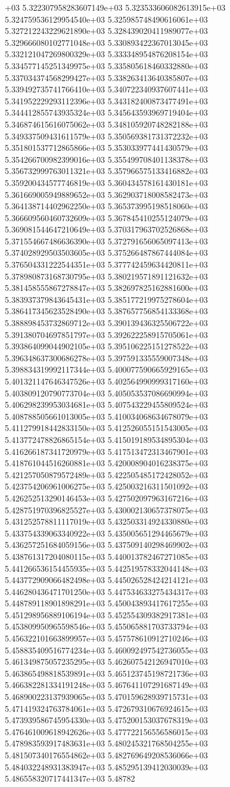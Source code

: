 +03	5.322307958283607149e+03	5.323533606082613915e+03	5.324759536129954540e+03	5.325985748490616061e+03	5.327212243229621890e+03	5.328439020411989077e+03	5.329666080102771048e+03	5.330893422367013045e+03	5.332121047269800329e+03	5.333348954876208154e+03	5.334577145251349975e+03	5.335805618460332880e+03	5.337034374568299427e+03	5.338263413640385807e+03	5.339492735741766410e+03	5.340722340937607441e+03	5.341952229293112396e+03	5.343182400873477491e+03	5.344412855743935324e+03	5.345643593969719404e+03	5.346874615616075062e+03	5.348105920748282188e+03	5.349337509431611579e+03	5.350569381731372232e+03	5.351801537712865866e+03	5.353033977441430579e+03	5.354266700982399016e+03	5.355499708401138378e+03	5.356732999763011321e+03	5.357966575133416882e+03	5.359200434577746819e+03	5.360434578161430181e+03	5.361669005949889652e+03	5.362903718008582473e+03	5.364138714402962250e+03	5.365373995198518060e+03	5.366609560460732609e+03	5.367845410255124079e+03	5.369081544647210649e+03	5.370317963702526868e+03	5.371554667486636390e+03	5.372791656065097413e+03	5.374028929503503605e+03	5.375266487867444084e+03	5.376504331222544351e+03	5.377742459634420811e+03	5.378980873168730795e+03	5.380219571891121632e+03	5.381458555867278847e+03	5.382697825162881600e+03	5.383937379843645431e+03	5.385177219975278604e+03	5.386417345623528490e+03	5.387657756854133368e+03	5.388898453732869712e+03	5.390139436325506722e+03	5.391380704697851797e+03	5.392622258915705061e+03	5.393864099044902105e+03	5.395106225151278522e+03	5.396348637300686278e+03	5.397591335559007348e+03	5.398834319992117344e+03	5.400077590665929165e+03	5.401321147646347526e+03	5.402564990999317160e+03	5.403809120790773704e+03	5.405053537086690994e+03	5.406298239953034681e+03	5.407543229455809524e+03	5.408788505661013005e+03	5.410034068634678079e+03	5.411279918442833150e+03	5.412526055151543005e+03	5.413772478826865154e+03	5.415019189534895304e+03	5.416266187341720979e+03	5.417513472313467901e+03	5.418761044516260881e+03	5.420008904016238375e+03	5.421257050879572489e+03	5.422505485172428052e+03	5.423754206961006275e+03	5.425003216311501092e+03	5.426252513290146453e+03	5.427502097963167216e+03	5.428751970396825527e+03	5.430002130657378075e+03	5.431252578811117019e+03	5.432503314924330880e+03	5.433754339063340922e+03	5.435005651294465679e+03	5.436257251684059156e+03	5.437509140298469902e+03	5.438761317204080115e+03	5.440013782467271085e+03	5.441266536154455935e+03	5.442519578332044148e+03	5.443772909066482498e+03	5.445026528424214121e+03	5.446280436471701250e+03	5.447534633275434317e+03	5.448789118901898291e+03	5.450043893417617255e+03	5.451298956889106194e+03	5.452554309382917381e+03	5.453809950965598546e+03	5.455065881703733794e+03	5.456322101663899957e+03	5.457578610912710246e+03	5.458835409516774234e+03	5.460092497542736055e+03	5.461349875057235295e+03	5.462607542126947010e+03	5.463865498818539891e+03	5.465123745198721736e+03	5.466382281334191248e+03	5.467641107291687149e+03	5.468900223137939065e+03	5.470159628939715731e+03	5.471419324763784061e+03	5.472679310676924615e+03	5.473939586745954330e+03	5.475200153037678319e+03	5.476461009618942626e+03	5.477722156556586015e+03	5.478983593917483631e+03	5.480245321768504255e+03	5.481507340176554862e+03	5.482769649208536066e+03	5.484032248931383947e+03	5.485295139412030039e+03	5.486558320717441347e+03	5.48782